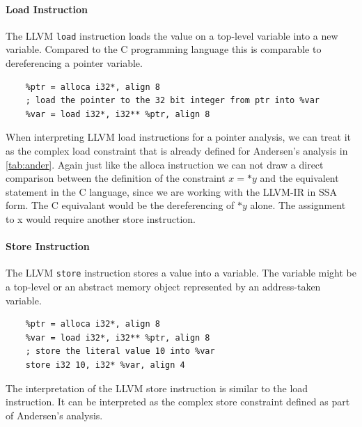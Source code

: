 \paragraph{Load Instruction}
The LLVM \verb|load| instruction loads the value on a top-level variable into a new variable. Compared to the C programming language this is comparable to dereferencing a pointer variable.
\begin{verbatim}
    %ptr = alloca i32*, align 8
    ; load the pointer to the 32 bit integer from ptr into %var
    %var = load i32*, i32** %ptr, align 8
\end{verbatim}
When interpreting LLVM load instructions for a pointer analysis, we can treat it as the complex load constraint that is already defined for Andersen's analysis in \autoref{tab:ander}.
Again just like the alloca instruction we can not draw a direct comparison between the definition of the constraint $x = *y$ and the equivalent statement in the C language, since we are working with the LLVM-IR in SSA form.
The C equivalant would be the dereferencing of $*y$ alone. The assignment to x would require another store instruction.

\paragraph{Store Instruction}
The LLVM \verb|store| instruction stores a value into a variable. The variable might be a top-level or an abstract memory object represented by an address-taken variable.
\begin{verbatim}
    %ptr = alloca i32*, align 8
    %var = load i32*, i32** %ptr, align 8
    ; store the literal value 10 into %var
    store i32 10, i32* %var, align 4
\end{verbatim}
The interpretation of the LLVM store instruction is similar to the load instruction. It can be interpreted as the complex store constraint defined as part of Andersen's analysis.

